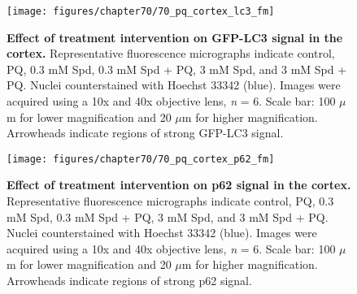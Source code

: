 \begin{landscape}
\begin{figure}[!htbp]
\center
  \texttt{[image: figures/chapter70/70\_pq\_cortex\_lc3\_fm]}
  \caption[Effect of treatment intervention on GFP-LC3 signal in the cortex]{\textbf{Effect of treatment intervention on GFP-LC3 signal in the cortex.} Representative fluorescence micrographs indicate control, PQ, 0.3 mM Spd, 0.3 mM Spd + PQ, 3 mM Spd, and 3 mM Spd + PQ. Nuclei counterstained with Hoechst 33342 (blue). Images were acquired using a 10x and 40x objective lens, \textit{n} = 6. Scale bar: 100 $\mu$m for lower magnification and 20 $\mu$m for higher magnification. Arrowheads indicate regions of strong GFP-LC3 signal.}
  \label{fig:70_pq_cortex_lc3_fm}
\end{figure} 
\end{landscape}

\begin{landscape}
\begin{figure}[!htbp]
\center
  \texttt{[image: figures/chapter70/70\_pq\_cortex\_p62\_fm]}
  \caption[Effect of treatment intervention on p62 signal in the cortex]{\textbf{Effect of treatment intervention on p62 signal in the cortex.} Representative fluorescence micrographs indicate control, PQ, 0.3 mM Spd, 0.3 mM Spd + PQ, 3 mM Spd, and 3 mM Spd + PQ. Nuclei counterstained with Hoechst 33342 (blue). Images were acquired using a 10x and 40x objective lens, \textit{n} = 6. Scale bar: 100 $\mu$m for lower magnification and 20 $\mu$m for higher magnification. Arrowheads indicate regions of strong p62 signal.}
  \label{fig:70_pq_cortex_p62_fm}
\end{figure} 
\end{landscape}

